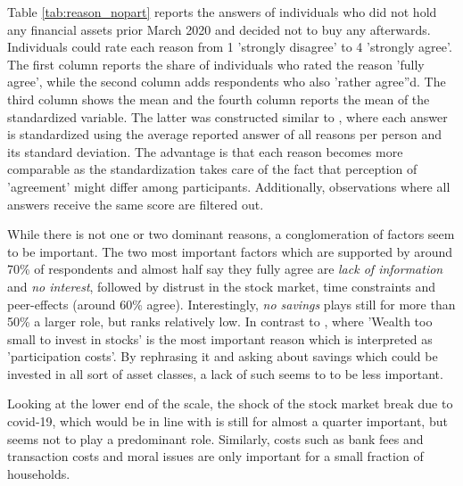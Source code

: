 \documentclass[ProjectABM]{subfiles}
\begin{document}
Table \ref{tab:reason_nopart} reports the answers of individuals who did not hold any financial assets prior March 2020 and decided not to buy any afterwards. Individuals could rate each reason from 1 'strongly disagree' to 4 'strongly agree'. The first column reports the share of individuals who rated the reason 'fully agree', while the second column adds respondents who also 'rather agree''d. The third column shows the mean and the fourth column reports the mean of the standardized variable. The latter was constructed similar to \cite{choi_2020}, where each answer is standardized using the average reported answer of all reasons per person and its standard deviation. The advantage is that each reason becomes more comparable as the standardization takes care of the fact that perception of 'agreement' might differ among participants. Additionally, observations where all answers receive the same score are filtered out.

While there is not one or two dominant reasons, a conglomeration of factors seem to be important. The two most important factors which are supported by around 70\% of respondents and almost half say they fully agree are \textit{lack of information} and \textit{no interest}, followed by distrust in the stock market, time constraints and peer-effects (around 60\% agree). Interestingly, \textit{no savings} plays still for more than 50\% a larger role, but ranks relatively low. In contrast to \cite{choi_2020}, where 'Wealth too small to invest in stocks' is the most important reason which is interpreted as 'participation costs'. By rephrasing it and asking about savings which could be invested in all sort of asset classes, a lack of such seems to to be less important.

Looking at the lower end of the scale, the shock of the stock market break due to covid-19, which would be in line with \cite{malmendier_2011} is still for almost a quarter important, but seems not to play a predominant role. Similarly, costs such as bank fees and transaction costs and moral issues are only important for a small fraction of households.



\end{document}
